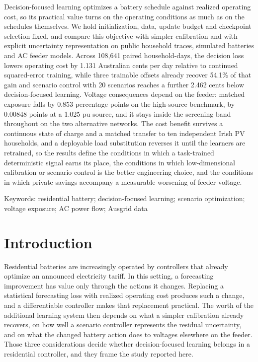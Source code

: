 \documentclass[pdflatex,Numbered,sn-basic]{sn-jnl}
\begin{document}
\maketitle

Decision-focused learning optimizes a battery schedule against realized operating cost, so its practical value turns on the operating conditions as much as on the schedules themselves. We hold initialization, data, update budget and checkpoint selection fixed, and compare this objective with simpler calibration and with explicit uncertainty representation on public household traces, simulated batteries and AC feeder models. Across 108,641 paired household-days, the decision loss lowers operating cost by 1.131 Australian cents per day relative to continued squared-error training, while three trainable offsets already recover 54.1\% of that gain and scenario control with 20 scenarios reaches a further 2.462 cents below decision-focused learning. Voltage consequences depend on the feeder: matched exposure falls by 0.853 percentage points on the high-source benchmark, by 0.00848 points at a 1.025 pu source, and it stays inside the screening band throughout on the two alternative networks. The cost benefit survives a continuous state of charge and a matched transfer to ten independent Irish PV households, and a deployable load substitution reverses it until the learners are retrained, so the results define the conditions in which a task-trained deterministic signal earns its place, the conditions in which low-dimensional calibration or scenario control is the better engineering choice, and the conditions in which private savings accompany a measurable worsening of feeder voltage.

Keywords: residential battery; decision-focused learning; scenario optimization; voltage exposure; AC power flow; Ausgrid data

\section{Introduction}

Residential batteries are increasingly operated by controllers that already optimize an announced electricity tariff. In this setting, a forecasting improvement has value only through the actions it changes. Replacing a statistical forecasting loss with realized operating cost produces such a change, and a differentiable controller makes that replacement practical. The worth of the additional learning system then depends on what a simpler calibration already recovers, on how well a scenario controller represents the residual uncertainty, and on what the changed battery action does to voltages elsewhere on the feeder. Those three considerations decide whether decision-focused learning belongs in a residential controller, and they frame the study reported here.
\end{document}
